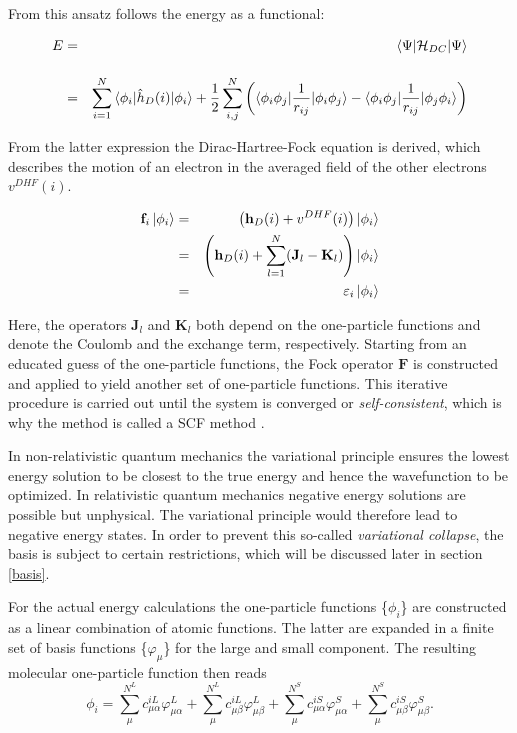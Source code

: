 From this ansatz follows the energy as a functional:

\begin{eqnarray}
  E &=& \braket{\Psi|\mathcal{H}_{DC}|\Psi}\\\vphantom{\rule{0pt}{30pt}}
  &=& \sum\limits_{i=1}^N\braket{\phi_i|\hat{h}_D(i)|\phi_i}  + \frac12 \sum\limits_{i,j}^N\left(\braket{\phi_i\phi_j|\frac1{r_{ij}}|\phi_i\phi_j} - \braket{\phi_i\phi_j|\frac1{r_{ij}}|\phi_j\phi_i}\right)
\end{eqnarray}

From the latter expression the Dirac-Hartree-Fock equation is derived, which
describes the motion of an electron in the averaged field of the other
electrons $v^{DHF}(i)$.

\begin{eqnarray}
\mathbf{f}_i\ket{\phi_i} &=& \left(\mathbf{h}_D(i) + v^{DHF}(i)\right)\ket{\phi_i}\\
                         &=& \left( \mathbf{h}_D(i) + \sum\limits_{l=1}^{N}(\mathbf{J}_l-\mathbf{K}_l)\right)\ket{\phi_i}\\
                         &=& \varepsilon_i\ket{\phi_i}
\end{eqnarray}

Here, the operators $\mathbf{J}_l$ and $\mathbf{K}_l$ both depend on the
one-particle functions and denote the Coulomb and the
exchange term, respectively.
Starting from an educated guess of the one-particle functions, the Fock operator
$\mathbf{F}$ is constructed and applied to yield another set of one-particle
functions. This iterative procedure is carried out until the system is
converged or \emph{self-consistent}, which is why the method is called a
\ac{SCF} method \cite{szabo}.

In non-relativistic quantum mechanics the variational principle ensures the
lowest energy solution to be closest to the true energy and hence the wavefunction
to be optimized. In relativistic quantum mechanics negative energy solutions
are possible but unphysical. The variational principle would therefore lead to
negative energy states. In order to prevent this so-called \emph{variational collapse},
the basis is subject to certain restrictions, which will be discussed later in
section \ref{basis}.
 
For the actual energy calculations the one-particle functions \{$\phi_i$\}
are constructed as a linear combination of atomic functions. The latter are
expanded in a finite set of basis functions \{$\varphi_\mu$\} for the large and small
component. The resulting molecular one-particle function then reads
\begin{equation}
\phi_i = \sum\limits_\mu^{N^L} c_{\mu\alpha}^{iL} \varphi_{\mu\alpha}^L +  \sum\limits_\mu^{N^L} c_{\mu\beta}^{iL} \varphi_{\mu\beta}^L + \sum\limits_\mu^{N^S} c_{\mu\alpha}^{iS} \varphi_{\mu\alpha}^S + \sum\limits_\mu^{N^S} c_{\mu\beta}^{iS} \varphi_{\mu\beta}^S.
\end{equation}

